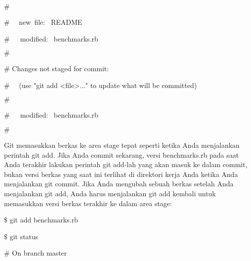 {\fontsize{14pt}{14pt}\selectfont  $  \#  $ \\} \par
\noindent 
{\fontsize{14pt}{14pt}\selectfont  $  \#  $~~ new~file:~  README \\} \par
\noindent 
{\fontsize{14pt}{14pt}\selectfont  $  \#  $~~~modified:~  benchmarks.rb \\} \par
\noindent 
{\fontsize{14pt}{14pt}\selectfont  $  \#  $ \\} \par
\noindent 
{\fontsize{14pt}{14pt}\selectfont  $  \#  $ Changes not staged for commit: \\} \par
\noindent 
{\fontsize{14pt}{14pt}\selectfont  $  \#  $~~ (use "git add <file>..." to update what will be committed) \\} \par
\noindent 
{\fontsize{14pt}{14pt}\selectfont  $  \#  $ \\} \par
\noindent 
{\fontsize{14pt}{14pt}\selectfont  $  \#  $~~~modified:~  benchmarks.rb \\} \par
\noindent 
{\fontsize{14pt}{14pt}\selectfont  $  \#  $ \\} \par
\vspace{14pt}
\noindent 
{\fontsize{14pt}{14pt}\selectfont Git memasukkan berkas ke area stage tepat seperti ketika Anda menjalankan perintah $  $git add. Jika Anda commit sekarang, versi benchmarks.rb pada saat Anda terakhir lakukan perintah $  $git add-lah yang akan masuk ke dalam commit, bukan versi berkas yang saat ini terlihat di direktori kerja Anda ketika Anda menjalankan $  $git commit. Jika Anda mengubah sebuah berkas setelah Anda menjalankan $  $git add, Anda harus menjalankan $  $git add $  $kembali untuk memasukkan versi berkas terakhir ke dalam area stage: \\} \par
\vspace{14pt}
\noindent 
{\fontsize{14pt}{14pt}\selectfont  $  \$  $ git add benchmarks.rb \\} \par
\noindent 
{\fontsize{14pt}{14pt}\selectfont  $  \$  $ git status \\} \par
\noindent 
{\fontsize{14pt}{14pt}\selectfont  $  \#  $ On branch master \\} \par
